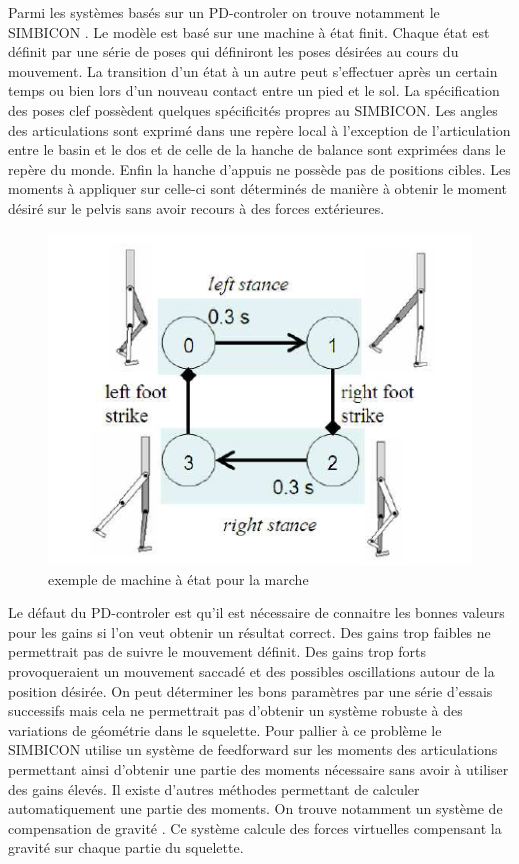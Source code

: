 \documentclass{llncs}
\begin{document}
Parmi les systèmes basés sur un PD-controler on trouve notamment le SIMBICON \cite{yin2007simbicon}. Le modèle est basé sur une machine à état finit. Chaque état est définit par une série de poses qui définiront les poses désirées au cours du mouvement. La transition d'un état à un autre peut s'effectuer après un certain temps ou bien lors d'un nouveau contact entre un pied et le sol. La spécification des poses clef possèdent quelques spécificités propres au SIMBICON. Les angles des articulations sont exprimé dans une repère local à l'exception de l'articulation entre le basin et le dos et de celle de la hanche de balance sont exprimées dans le repère du monde. Enfin la hanche d'appuis ne possède pas de positions cibles. Les moments à appliquer sur celle-ci sont déterminés de manière à obtenir le moment désiré sur le pelvis sans avoir recours à des forces extérieures.
\begin{figure}[h]
    \centering
    \includegraphics[scale=0.5]{state_machine.png}
    \caption{exemple de machine à état pour la marche \cite{yin2007simbicon}}
    \label{fig:state_machine}
\end{figure}


Le défaut du PD-controler est qu'il est nécessaire de connaitre les bonnes valeurs pour les gains si l'on veut obtenir un résultat correct. Des gains trop faibles ne permettrait pas de suivre le mouvement définit. Des gains trop forts provoqueraient un mouvement saccadé et des possibles oscillations autour de la position désirée. On peut déterminer les bons paramètres par une série d'essais successifs mais cela ne permettrait pas d'obtenir un système robuste à des variations de géométrie dans le squelette. Pour pallier à ce problème le SIMBICON utilise un système de feedforward \cite{yin2007simbicon} sur les moments des articulations permettant ainsi d'obtenir une partie des moments nécessaire sans avoir à utiliser des gains élevés. Il existe d'autres méthodes permettant de calculer automatiquement une partie des moments. On trouve notamment un système de compensation de gravité \cite{coros2010generalized}. Ce système calcule des forces virtuelles compensant la gravité sur chaque partie du squelette.
\end{document}
